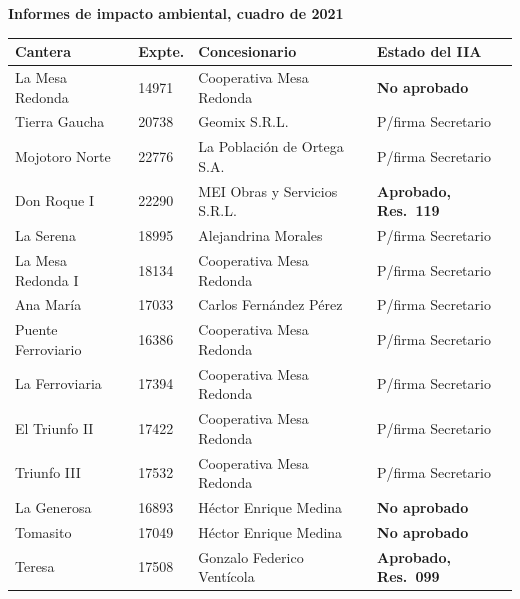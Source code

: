 {\sffamily\bfseries\footnotesize Informes de impacto ambiental, cuadro de 2021\par}
\vspace{0.5em}
{\small
\setlength{\LTpre}{0.6em}\setlength{\LTpost}{1.2em}
\begin{longtable}{@{}p{3.0cm}p{1.1cm}p{4.0cm}p{3.4cm}@{}}
\toprule
\textbf{Cantera} & \textbf{Expte.} & \textbf{Concesionario} & \textbf{Estado del IIA} \\
\midrule
\endhead
La Mesa Redonda & 14971 & Cooperativa Mesa Redonda & \textbf{No aprobado} \\
Tierra Gaucha & 20738 & Geomix S.R.L. & P/firma Secretario \\
Mojotoro Norte & 22776 & La Población de Ortega S.A. & P/firma Secretario \\
Don Roque I & 22290 & MEI Obras y Servicios S.R.L. & \textbf{Aprobado, Res.\ 119} \\
La Serena & 18995 & Alejandrina Morales & P/firma Secretario \\
La Mesa Redonda I & 18134 & Cooperativa Mesa Redonda & P/firma Secretario \\
Ana María & 17033 & Carlos Fernández Pérez & P/firma Secretario \\
Puente Ferroviario & 16386 & Cooperativa Mesa Redonda & P/firma Secretario \\
La Ferroviaria & 17394 & Cooperativa Mesa Redonda & P/firma Secretario \\
El Triunfo II & 17422 & Cooperativa Mesa Redonda & P/firma Secretario \\
Triunfo III & 17532 & Cooperativa Mesa Redonda & P/firma Secretario \\
La Generosa & 16893 & Héctor Enrique Medina & \textbf{No aprobado} \\
Tomasito & 17049 & Héctor Enrique Medina & \textbf{No aprobado} \\
Teresa & 17508 & Gonzalo Federico Ventícola & \textbf{Aprobado, Res.\ 099} \\
\bottomrule
\end{longtable}
}

